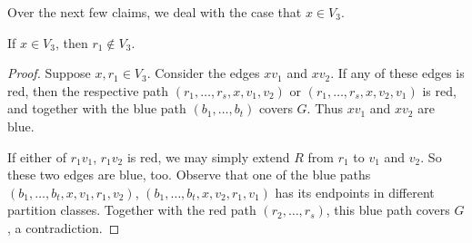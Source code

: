 \documentclass[a4paper,10pt]{article}
\begin{document}
Over the next few claims, we deal with the case that $x \in V_3$.

\begin{claim}\label{xV3-a}
If $x \in V_3$, then $r_1\notin V_3$.
\end{claim}
\begin{proof}
Suppose $x, r_1 \in V_3$. Consider the edges $xv_1$ and $xv_2$. If any of these edges is red, then the respective  path $(r_1,\ldots,r_s,x,v_1,v_2)$ or $(r_1,\ldots,r_s,x,v_2,v_1)$ is red, and together with the blue path $(b_1,\ldots,b_t)$ covers $G$. Thus $xv_1$ and $xv_2$ are blue.

If either of  $r_1v_1$, $r_1v_2$ is  red, we may simply extend $R$ from $r_1$ to $v_1$ and $v_2$. So these two edges are blue, too. Observe that one of the blue paths  $(b_1,\ldots,b_t,x,v_1,r_1,v_2)$,  $(b_1,\ldots,b_t,x,v_2,r_1,v_1)$ has its endpoints in different partition classes. Together with  the red path $(r_2,\ldots,r_s)$, this blue path covers $G$, a contradiction.
\end{proof}
\end{document}
